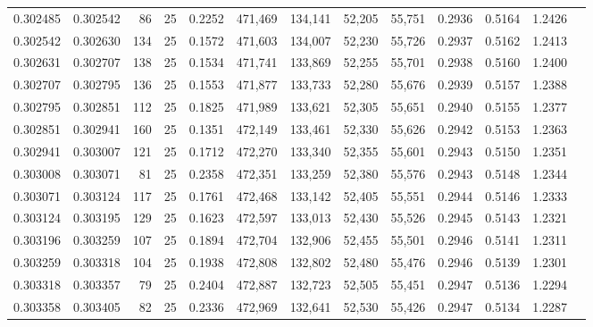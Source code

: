 \begin{tabular}{rrrrrrrrrrrrr}
0.302485 & 0.302542 &    86 &  25 &                                     0.2252 & 471,469 & 134,141 &  52,205 &  55,751 & 0.2936 & 0.5164 & 1.2426 \\
0.302542 & 0.302630 &   134 &  25 &                                     0.1572 & 471,603 & 134,007 &  52,230 &  55,726 & 0.2937 & 0.5162 & 1.2413 \\
0.302631 & 0.302707 &   138 &  25 &                                     0.1534 & 471,741 & 133,869 &  52,255 &  55,701 & 0.2938 & 0.5160 & 1.2400 \\
0.302707 & 0.302795 &   136 &  25 &                                     0.1553 & 471,877 & 133,733 &  52,280 &  55,676 & 0.2939 & 0.5157 & 1.2388 \\
0.302795 & 0.302851 &   112 &  25 &                                     0.1825 & 471,989 & 133,621 &  52,305 &  55,651 & 0.2940 & 0.5155 & 1.2377 \\
0.302851 & 0.302941 &   160 &  25 &                                     0.1351 & 472,149 & 133,461 &  52,330 &  55,626 & 0.2942 & 0.5153 & 1.2363 \\
0.302941 & 0.303007 &   121 &  25 &                                     0.1712 & 472,270 & 133,340 &  52,355 &  55,601 & 0.2943 & 0.5150 & 1.2351 \\
0.303008 & 0.303071 &    81 &  25 &                                     0.2358 & 472,351 & 133,259 &  52,380 &  55,576 & 0.2943 & 0.5148 & 1.2344 \\
0.303071 & 0.303124 &   117 &  25 &                                     0.1761 & 472,468 & 133,142 &  52,405 &  55,551 & 0.2944 & 0.5146 & 1.2333 \\
0.303124 & 0.303195 &   129 &  25 &                                     0.1623 & 472,597 & 133,013 &  52,430 &  55,526 & 0.2945 & 0.5143 & 1.2321 \\
0.303196 & 0.303259 &   107 &  25 &                                     0.1894 & 472,704 & 132,906 &  52,455 &  55,501 & 0.2946 & 0.5141 & 1.2311 \\
0.303259 & 0.303318 &   104 &  25 &                                     0.1938 & 472,808 & 132,802 &  52,480 &  55,476 & 0.2946 & 0.5139 & 1.2301 \\
0.303318 & 0.303357 &    79 &  25 &                                     0.2404 & 472,887 & 132,723 &  52,505 &  55,451 & 0.2947 & 0.5136 & 1.2294 \\
0.303358 & 0.303405 &    82 &  25 &                                     0.2336 & 472,969 & 132,641 &  52,530 &  55,426 & 0.2947 & 0.5134 & 1.2287 \\

\end{tabular}
